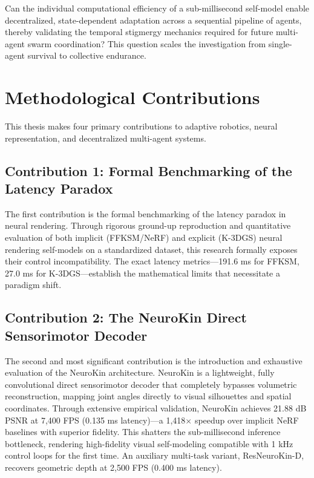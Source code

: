 ﻿\documentclass[12pt,a4paper,oneside]{report}
\begin{document}
Can the individual computational efficiency of a sub-millisecond self-model enable decentralized, state-dependent adaptation across a sequential pipeline of agents, thereby validating the temporal stigmergy mechanics required for future multi-agent swarm coordination? This question scales the investigation from single-agent survival to collective endurance.

\section{Methodological Contributions}

This thesis makes four primary contributions to adaptive robotics, neural representation, and decentralized multi-agent systems.

\subsection{Contribution 1: Formal Benchmarking of the Latency Paradox}

The first contribution is the formal benchmarking of the latency paradox in neural rendering. Through rigorous ground-up reproduction and quantitative evaluation of both implicit (FFKSM/NeRF) and explicit (K-3DGS) neural rendering self-models on a standardized dataset, this research formally exposes their control incompatibility. The exact latency metrics---191.6 ms for FFKSM, 27.0 ms for K-3DGS---establish the mathematical limits that necessitate a paradigm shift.

\subsection{Contribution 2: The NeuroKin Direct Sensorimotor Decoder}

The second and most significant contribution is the introduction and exhaustive evaluation of the NeuroKin architecture. NeuroKin is a lightweight, fully convolutional direct sensorimotor decoder that completely bypasses volumetric reconstruction, mapping joint angles directly to visual silhouettes and spatial coordinates. Through extensive empirical validation, NeuroKin achieves 21.88 dB PSNR at 7,400 FPS (0.135 ms latency)---a 1,418$\times$ speedup over implicit NeRF baselines with superior fidelity. This shatters the sub-millisecond inference bottleneck, rendering high-fidelity visual self-modeling compatible with 1 kHz control loops for the first time. An auxiliary multi-task variant, ResNeuroKin-D, recovers geometric depth at 2,500 FPS (0.400 ms latency).
\end{document}
